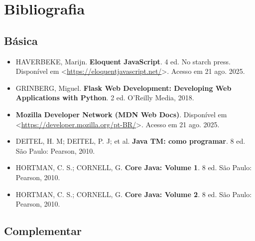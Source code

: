 \documentclass[a4paper, 12pt]{article}
\begin{document}
\section{Bibliografia}

\subsection{Básica}

\begin{itemize}
    \item HAVERBEKE, Marijn. \textbf{Eloquent JavaScript}. 4 ed. No starch press. Disponível em <\url{https://eloquentjavascript.net/}>. Acesso em 21 ago. 2025.
    \item GRINBERG, Miguel. \textbf{Flask Web Development: Developing Web Applications with Python}. 2 ed. O'Reilly Media, 2018.
    \item \textbf{Mozilla Developer Network (MDN Web Docs)}. Disponível em <\url{https://developer.mozilla.org/pt-BR/}>. Acesso em 21 ago. 2025.
    \item DEITEL, H. M; DEITEL, P. J; et al. \textbf{Java TM: como programar}. 8 ed. São Paulo: Pearson, 2010.
    \item HORTMAN, C. S.; CORNELL, G. \textbf{Core Java: Volume 1}. 8 ed. São Paulo: Pearson, 2010.
    \item HORTMAN, C. S.; CORNELL, G. \textbf{Core Java: Volume 2}. 8 ed. São Paulo: Pearson, 2010.
\end{itemize}

\subsection{Complementar}
\end{document}
